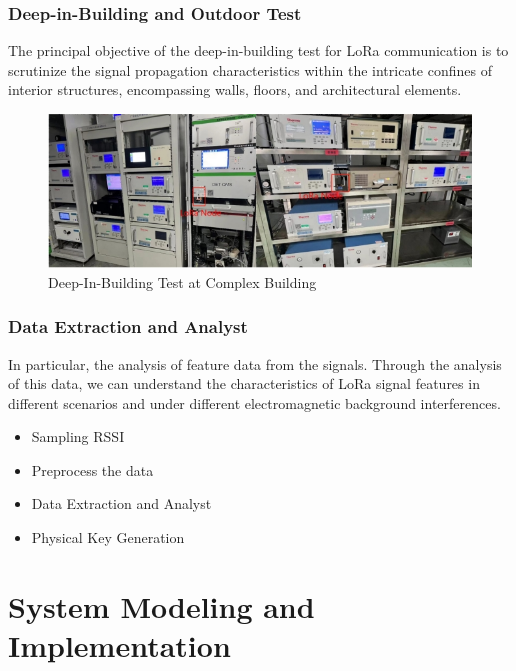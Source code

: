 \documentclass{beamer}
\begin{document}
\begin{frame}
  \frametitle{Deep-in-Building and Outdoor Test}
  The principal objective of the deep-in-building test for LoRa communication is to scrutinize the signal propagation characteristics within the intricate confines of interior structures, encompassing walls, floors, and architectural elements.
  \begin{figure}
    \centering
    \includegraphics[width=0.8\linewidth]{../figures/fig3-5.png}
    \caption{Deep-In-Building Test at Complex Building}
    \label{fig:3-5}
  \end{figure}
\end{frame}

\begin{frame}
  \frametitle{Data Extraction and Analyst}

  In particular, the analysis of feature data from the signals. Through the analysis of this data, we can understand the characteristics of LoRa signal features in different scenarios and under different electromagnetic background interferences.
  \begin{itemize}
    \item Sampling RSSI
    \item Preprocess the data
    \item Data Extraction and Analyst
    \item Physical Key Generation
  \end{itemize}
\end{frame}


\section{System Modeling and Implementation}
\end{document}
